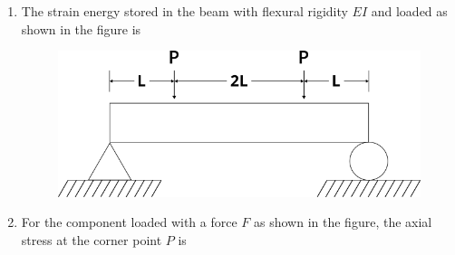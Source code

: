 \documentclass[journal,12pt,onecolumn]{IEEEtran}
\begin{document}
\begin{enumerate}
    \item The strain energy stored in the beam with flexural rigidity $EI$ and loaded as shown in the figure is\\

          \begin{figure}[H]
              \centering
              \includegraphics[scale=0.5]{q30}
              \caption{}
              \label{q30}
          \end{figure}

          \begin{enumerate}
          \end{enumerate}

    \item For the component loaded with a force $F$ as shown in the figure, the axial stress at the corner point $P$ is\\


\end{enumerate}
\end{document}
